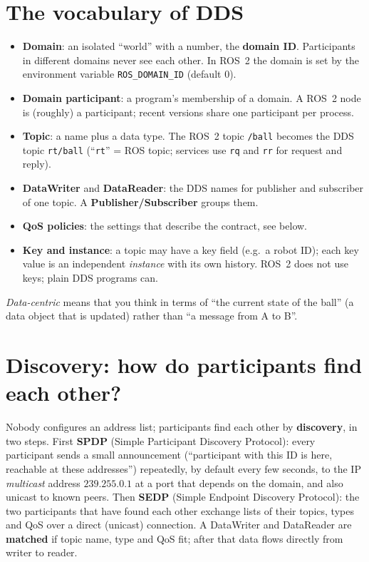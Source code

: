 \section*{The vocabulary of DDS}
\begin{itemize}[nosep]
\item \textbf{Domain}: an isolated ``world'' with a number, the \textbf{domain ID}. Participants in different domains never see each other. In ROS~2 the domain is set by the environment variable \verb!ROS_DOMAIN_ID! (default $0$).
\item \textbf{Domain participant}: a program's membership of a domain. A ROS~2 node is (roughly) a participant; recent versions share one participant per process.
\item \textbf{Topic}: a name plus a data type. The ROS~2 topic \verb!/ball! becomes the DDS topic \verb!rt/ball! (``\verb!rt!'' = ROS topic; services use \verb!rq! and \verb!rr! for request and reply).
\item \textbf{DataWriter} and \textbf{DataReader}: the DDS names for publisher and subscriber of one topic. A \textbf{Publisher/Subscriber} groups them.
\item \textbf{QoS policies}: the settings that describe the contract, see below.
\item \textbf{Key and instance}: a topic may have a key field (e.g.\ a robot ID); each key value is an independent \emph{instance} with its own history. ROS~2 does not use keys; plain DDS programs can.
\end{itemize}
\emph{Data-centric} means that you think in terms of ``the current state of the ball'' (a data object that is updated) rather than ``a message from A to B''.

\section*{Discovery: how do participants find each other?}
Nobody configures an address list; participants find each other by \textbf{discovery}, in two steps. First \textbf{SPDP} (Simple Participant Discovery Protocol): every participant sends a small announcement (``participant with this ID is here, reachable at these addresses'') repeatedly, by default every few seconds, to the IP \emph{multicast} address $239.255.0.1$ at a port that depends on the domain, and also unicast to known peers. Then \textbf{SEDP} (Simple Endpoint Discovery Protocol): the two participants that have found each other exchange lists of their topics, types and QoS over a direct (unicast) connection. A DataWriter and DataReader are \textbf{matched} if topic name, type and QoS fit; after that data flows directly from writer to reader.

